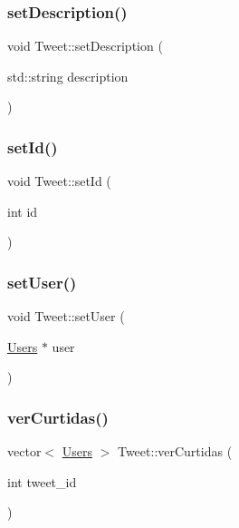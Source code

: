 \mbox{\label{class_tweet_a5555b6ad8543cfe17262bd6f3ef7e1a9}} 
\subsubsection{\texorpdfstring{set\+Description()}{setDescription()}}
{\footnotesize\ttfamily void Tweet\+::set\+Description (\begin{DoxyParamCaption}\item[{std\+::string}]{description }\end{DoxyParamCaption})}

\mbox{\label{class_tweet_a646308cec056effe64ac5f81f5c00bfa}} 
\subsubsection{\texorpdfstring{set\+Id()}{setId()}}
{\footnotesize\ttfamily void Tweet\+::set\+Id (\begin{DoxyParamCaption}\item[{int}]{id }\end{DoxyParamCaption})}

\mbox{\label{class_tweet_a1c1483f00fccc2ca3f743b9224b09a76}} 
\subsubsection{\texorpdfstring{set\+User()}{setUser()}}
{\footnotesize\ttfamily void Tweet\+::set\+User (\begin{DoxyParamCaption}\item[{\hyperlink{class_users}{Users} $\ast$}]{user }\end{DoxyParamCaption})}

\mbox{\label{class_tweet_a85dfc231458b7595ab1ca1a7ca88e36e}} 
\subsubsection{\texorpdfstring{ver\+Curtidas()}{verCurtidas()}}
{\footnotesize\ttfamily vector$<$ \hyperlink{class_users}{Users} $>$ Tweet\+::ver\+Curtidas (\begin{DoxyParamCaption}\item[{int}]{tweet\+\_\+id }\end{DoxyParamCaption})}



